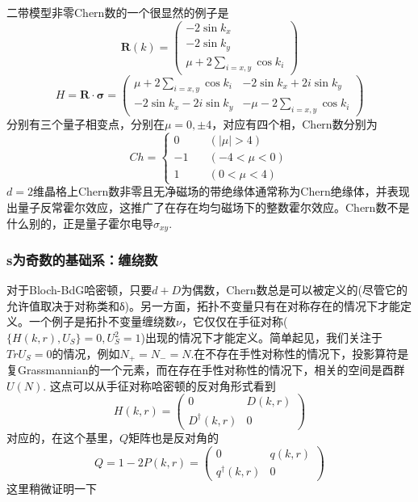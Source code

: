 \documentclass{article}
\numberwithin{equation}{subsection}
\begin{document}
二带模型非零Chern数的一个很显然的例子是
\begin{equation}
    \mathbf{R}(k)=\begin{pmatrix}
        -2\sin k_x\\
        -2\sin k_y\\
        \mu+2\sum_{i=x,y}\cos k_i
    \end{pmatrix}
\end{equation}
\begin{equation}
    H=\mathbf{R}\cdot \bm{\sigma}=\begin{pmatrix}
        \mu+2\sum_{i=x,y}\cos{k_i}&-2\sin k_x+2i\sin k_y\\
        -2\sin k_x-2i\sin k_y&-\mu-2\sum_{i=x,y}\cos k_i
    \end{pmatrix}
\end{equation}
分别有三个量子相变点，分别在$\mu=0,\pm 4$，对应有四个相，Chern数分别为
\begin{equation}
    Ch=\begin{cases}
        0\quad&(|\mu|>4)\\
        -1\quad&(-4<\mu<0)\\
        1\quad&(0<\mu<4)
    \end{cases}
\end{equation}
$d=2$维晶格上Chern数非零且无净磁场的带绝缘体通常称为Chern绝缘体，并表现出量子反常霍尔效应，这推广了在存在均匀磁场下的整数霍尔效应。Chern数不是什么别的，正是量子霍尔电导$\sigma_{xy}$.

\subsubsection{s为奇数的基础系：缠绕数}
对于Bloch-BdG哈密顿，只要$d+D$为偶数，Chern数总是可以被定义的(尽管它的允许值取决于对称类和δ)。另一方面，拓扑不变量只有在对称存在的情况下才能定义。一个例子是拓扑不变量缠绕数$\nu$，它仅仅在手征对称($\{H(k,r),U_S\}=0,U_S^2=1$)出现的情况下才能定义。简单起见，我们关注于$TrU_S=0$的情况，例如$N_+=N_-=N$.在不存在手性对称性的情况下，投影算符是复Grassmannian的一个元素，而在存在手性对称性的情况下，相关的空间是酉群$U(N)$. 这点可以从手征对称哈密顿的反对角形式看到
\begin{equation}
    H(k,r)=\begin{pmatrix}
        0&D(k,r)\\
        D^\dagger(k,r)&0
    \end{pmatrix}
\end{equation}
对应的，在这个基里，$Q$矩阵也是反对角的
\begin{equation}
    Q=1-2P(k,r)=\begin{pmatrix}
        0&q(k,r)\\
        q^\dagger(k,r)&0
    \end{pmatrix}
\end{equation}
这里稍微证明一下
\end{document}

